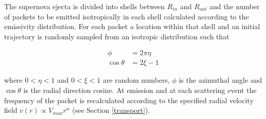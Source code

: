 \documentclass[useAMS,usenatbib,usegraphicx]{mnras}
\begin{document}
The supernova ejecta is divided into shells between $R_{in}$ and $R_{out}$ 
and the number of packets to be emitted isotropically in each shell calculated according 
to the emissivity distribution.  For each packet 
a location within that shell and an initial trajectory is randomly sampled 
from an isotropic distribution such that

\begin{align}
\phi&=2\pi\eta \\
 \cos \theta&=2\xi -1
\end{align}

\noindent where $0<\eta<1$ and $0<\xi<1$ are random numbers, $\phi$ is the 
azimuthal angle and $\cos \theta$ is the radial direction cosine.  At 
emission and at each scattering event the frequency of the packet is 
recalculated according to the specified radial velocity field $v(r) 
\propto V_{max}r^{\alpha}$ (see Section \ref{transport}).
\end{document}
